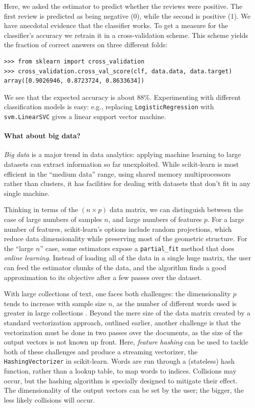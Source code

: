 \documentclass[a4paper]{article}
\begin{document}
Here, we asked the estimator to predict whether the reviews were
positive.
The first review is predicted as being negative (0),
while the second is positive (1). We have
anecdotal evidence that the classifier works. To get a measure for the
classifier's accuracy we retrain it in a cross-validation scheme.
This scheme yields the fraction of correct answers on three different folds:
\begin{lstlisting}
>>> from sklearn import cross_validation
>>> cross_validation.cross_val_score(clf, data.data, data.target)
array([0.9026946, 0.8723724, 0.8633634])
\end{lstlisting}

We see that the expected accuracy is about 88\%.
Experimenting with different classification models is easy:
e.g., replacing \texttt{LogisticRegression} with \texttt{svm.LinearSVC}
gives a linear support vector machine.

\paragraph{What about big data?}
%
\emph{Big data} is a major trend in data analytics: applying machine
learning to large datasets can extract information so far unexploited.
While scikit-learn is most efficient in the ``medium data'' range,
using shared memory multiprocessors rather than clusters,
it has facilities for dealing with datasets that don't fit
in any single machine.

Thinking in terms of the $(n \times p)$ data matrix,
we can distinguish between the case of large numbers of samples $n$,
and large numbers of features $p$.
For a large number of features, scikit-learn's options include
random projections, which reduce data dimensionality
while preserving most of the geometric structure.
For the ``large $n$'' case, some estimators expose a \texttt{partial\_fit}
method that does \emph{online learning}.
Instead of loading all of the data in a single huge matrix, the user
can feed the estimator chunks of the data,
and the algorithm finds a good approximation to its objective
after a few passes over the dataset.

With large collections of text, one faces both challenges:
the dimensionality $p$
tends to increase with sample size $n$, as the number of different words used
is greater in large collections \cite[88--89]{manning2009}.
Beyond the mere size of the data matrix
created by a standard vectorization approach, outlined earlier, another challenge
is that the vectorization must be done in two passes over the documents,
as the size of the output vectors is not known up front.
Here, \emph{feature hashing} can be used
to tackle both of these challenges and produce a streaming vectorizer,
the {\tt HashingVectorizer} in scikit-learn.
Words are run through a (stateless) hash function, rather than a lookup table,
to map words to indices.
Collisions may occur, but the hashing algorithm \cite{weinberger2009}
is specially designed to mitigate their effect.
The dimensionality of the output vectors can be set by the user;
the bigger, the less likely collisions will occur.
\end{document}

